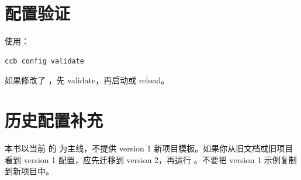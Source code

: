 \section{配置验证}

使用：

\begin{lstlisting}
ccb config validate
\end{lstlisting}

如果修改了 ，先 validate，再启动或 reload。

\section{历史配置补充}

本书以当前  的  为主线，不提供 version 1 新项目模板。如果你从旧文档或旧项目看到 version 1 配置，应先迁移到 version 2，再运行 。不要把 version 1 示例复制到新项目中。
